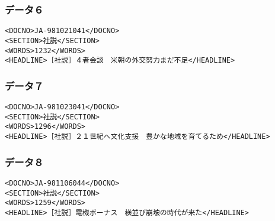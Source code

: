 \subsubsection{データ６}
\begin{verbatim}
<DOCNO>JA-981021041</DOCNO>
<SECTION>社説</SECTION>
<WORDS>1232</WORDS>
<HEADLINE>［社説］４者会談　米朝の外交努力まだ不足</HEADLINE>
\end{verbatim}

\subsubsection{データ７}
\begin{verbatim}
<DOCNO>JA-981023041</DOCNO>
<SECTION>社説</SECTION>
<WORDS>1296</WORDS>
<HEADLINE>［社説］２１世紀へ文化支援　豊かな地域を育てるため</HEADLINE>
\end{verbatim}

\subsubsection{データ８}
\begin{verbatim}
<DOCNO>JA-981106044</DOCNO>
<SECTION>社説</SECTION>
<WORDS>1259</WORDS>
<HEADLINE>［社説］電機ボーナス　横並び崩壊の時代が来た</HEADLINE>
\end{verbatim}
